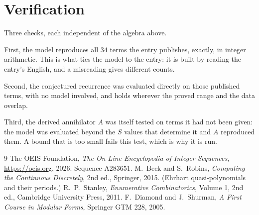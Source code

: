 \documentclass[11pt,a4paper]{article}
\theoremstyle{plain}
\theoremstyle{definition}
\begin{document}
\section{Verification}

Three checks, each independent of the algebra above.

First, the model reproduces all $34$ terms the entry publishes, exactly, in integer
arithmetic. This is what ties the model to the entry: it is built by reading the entry's
English, and a misreading gives different counts.

Second, the conjectured recurrence was evaluated directly on those published terms, with no
model involved, and holds wherever the proved range and the data overlap.

Third, the derived annihilator $A$ was itself tested on terms it had not been given: the model
was evaluated beyond the $S$ values that determine it and $A$ reproduced them. A bound that is
too small fails this test, which is why it is run.

\begin{thebibliography}{9}
 The OEIS Foundation, \emph{The On-Line Encyclopedia of Integer
Sequences}, \url{https://oeis.org}, 2026. Sequence A283651.
 M.~Beck and S.~Robins, \emph{Computing the Continuous Discretely},
2nd ed., Springer, 2015. (Ehrhart quasi-polynomials and their periods.)
 R.~P.~Stanley, \emph{Enumerative Combinatorics}, Volume 1, 2nd ed.,
Cambridge University Press, 2011.
 F.~Diamond and J.~Shurman, \emph{A First Course in Modular Forms},
Springer GTM 228, 2005.
\end{thebibliography}
\end{document}
